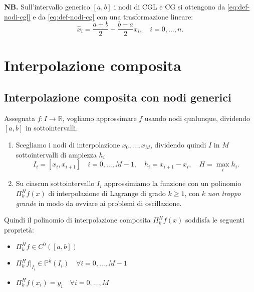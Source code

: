 \textbf{NB.}
Sull'intervallo generico $[ a,b]$ i nodi di CGL e CG si ottengono da \eqref{eq:def-nodi-cgl} e da \eqref{eq:def-nodi-cg} con una trasformazione lineare:
\begin{equation*}
\hat{x}_{i} =\frac{a+b}{2} +\frac{b-a}{2} x_{i}, \quad i=0,\dotsc ,n.
\end{equation*}

\section{Interpolazione composita}
\subsection{Interpolazione composita con nodi generici}
Assegnata $f:I\rightarrow \mathbb{R}$, vogliamo approssimare $f$ usando nodi qualunque, dividendo $[ a,b]$ in sottointervalli.
\begin{enumerate}
    \item Scegliamo i nodi di interpolazione $x_0,\dots,x_M$, dividendo quindi $I$ in $M$ sottointervalli di ampiezza $h_i$
    $$I_{i} =[ x_{i} ,x_{i+1}] \quad i=0,\dotsc ,M-1, \quad h_{i} =x_{i+1}-x_i,\quad H=\max_{i}h_i.$$
    \item Su ciascun sottointervallo $I_{i}$ approssimiamo la funzione con un polinomio $\Pi ^{H}_{k} f(x)$ di interpolazione di Lagrange di grado $k\geqslant 1$, con $k$ \textit{non troppo grande} in modo da ovviare ai problemi di oscillazione.
\end{enumerate}
Quindi il polinomio di interpolazione composita $\Pi ^{H}_{k} f(x)$ soddisfa le seguenti proprietà:
\begin{itemize}
    \item $\Pi ^{H}_{k} f\in C^0([a,b])$
    \item $\Pi ^{H}_{k} f|_{I_i}\in \mathbb P^k(I_i)\quad \forall i=0,\dots ,M-1$
    \item $\Pi ^{H}_{k} f(x_i)=y_i\quad \forall i=0,\dots ,M$
\end{itemize}

